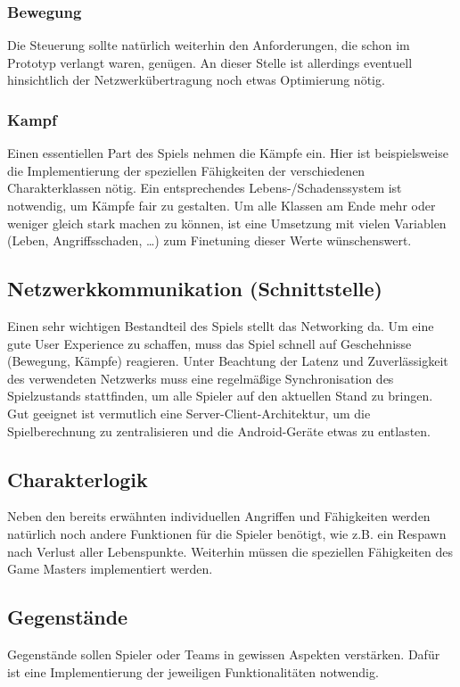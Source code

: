 \documentclass[10pt,a4paper,notitlepage]{report}
\begin{document}
\begin{flushleft}
\subsubsection{Bewegung}
Die Steuerung sollte natürlich weiterhin den Anforderungen, die schon im Prototyp verlangt waren, genügen. An dieser Stelle ist allerdings eventuell hinsichtlich der Netzwerkübertragung noch etwas Optimierung nötig. 

\subsubsection{Kampf} 
Einen essentiellen Part des Spiels nehmen die Kämpfe ein. Hier ist beispielsweise die Implementierung der speziellen Fähigkeiten der verschiedenen Charakterklassen nötig. Ein entsprechendes Lebens-/Schadenssystem ist notwendig, um Kämpfe fair zu gestalten. Um alle Klassen am Ende mehr oder weniger gleich stark machen zu können, ist eine Umsetzung mit vielen Variablen (Leben, Angriffsschaden, …) zum Finetuning dieser Werte wünschenswert. 

\subsection{Netzwerkkommunikation (Schnittstelle)}
Einen sehr wichtigen Bestandteil des Spiels stellt das Networking da. Um eine gute User Experience zu schaffen, muss das Spiel schnell auf Geschehnisse (Bewegung, Kämpfe) reagieren. Unter Beachtung der Latenz und Zuverlässigkeit des verwendeten Netzwerks muss eine regelmäßige Synchronisation des Spielzustands stattfinden, um alle Spieler auf den aktuellen Stand zu bringen. Gut geeignet ist vermutlich eine Server-Client-Architektur, um die Spielberechnung zu zentralisieren und die Android-Geräte etwas zu entlasten. 

\subsection{Charakterlogik} 
Neben den bereits erwähnten individuellen Angriffen und Fähigkeiten werden natürlich noch andere Funktionen für die Spieler benötigt, wie z.B. ein Respawn nach Verlust aller Lebenspunkte. Weiterhin müssen die speziellen Fähigkeiten des Game Masters implementiert werden.

\subsection{Gegenstände}
Gegenstände sollen Spieler oder Teams in gewissen Aspekten verstärken. Dafür ist eine Implementierung der jeweiligen Funktionalitäten notwendig.


\end{flushleft}
\end{document}
